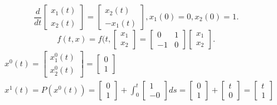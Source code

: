 \documentclass[../main.tex]{subfiles}
\begin{document}
\begin{przyklad}
    \[
        \frac{d}{dt} \begin{bmatrix} x_1(t)\\x_2(t) \end{bmatrix} = \begin{bmatrix} x_2(t)\\-x_1(t) \end{bmatrix} ,
        x_1(0) = 0, x_2(0) =  1
    .\]
    \[
        f(t,x) = f(t,\begin{bmatrix} x_1\\x_2 \end{bmatrix} = \begin{bmatrix} 0&1\\-1&0 \end{bmatrix} \begin{bmatrix} x_1\\x_2 \end{bmatrix}
    .\]
    \begin{align*}
        &x^0(t) = \begin{bmatrix} x_1^0(t)\\x_2^0(t) \end{bmatrix} = \begin{bmatrix} 0\\1 \end{bmatrix}\\
        &x^1(t) = P(x^0(t)) = \begin{bmatrix} 0\\1 \end{bmatrix} + \int_0^t \begin{bmatrix} 1\\-0 \end{bmatrix} ds = \begin{bmatrix} 0\\1 \end{bmatrix} + \begin{bmatrix} t\\0 \end{bmatrix} = \begin{bmatrix} t\\1 \end{bmatrix}\\

\end{align*}
\end{przyklad}
\end{document}

